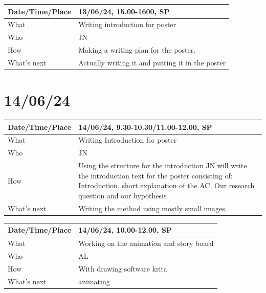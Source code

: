 \documentclass{article}
\begin{document}
\begin{table}[H]
\begin{tabular}{|p{1.5in}|p{4in}|}
\hline
Date/Time/Place & 13/06/24, 15.00-1600, SP \\ \hline
What            & Writing introduction for poster \\ \hline
Who             & JN \\ \hline
How             & Making a writing plan for the poster. \\ \hline
What's next     & Actually writing it and putting it in the poster \\ \hline
\end{tabular}
\end{table}


\section{14/06/24}


\begin{table}[H]
\begin{tabular}{|p{1.5in}|p{4in}|}
\hline
Date/Time/Place & 14/06/24, 9.30-10.30/11.00-12.00, SP \\ \hline
What            & Writing Introduction for poster \\ \hline
Who             & JN \\ \hline
How             & Using the structure for the introduction JN will write the introduction text for the poster consisting of: Introduction, short explanation of the AC, Our research question and our hypothesis \\ \hline
What's next     & Writing the method using mostly small images. \\ \hline
\end{tabular}
\end{table}

\begin{table}[H]
\begin{tabular}{|p{1.5in}|p{4in}|}
\hline
Date/Time/Place & 14/06/24, 10.00-12.00, SP \\ \hline
What            &  Working on the animation and story board\\ \hline
Who             & AL \\ \hline
How             & With drawing software krita  \\ \hline
What's next     &  animating\\ \hline
\end{tabular}
\end{table}
\end{document}
